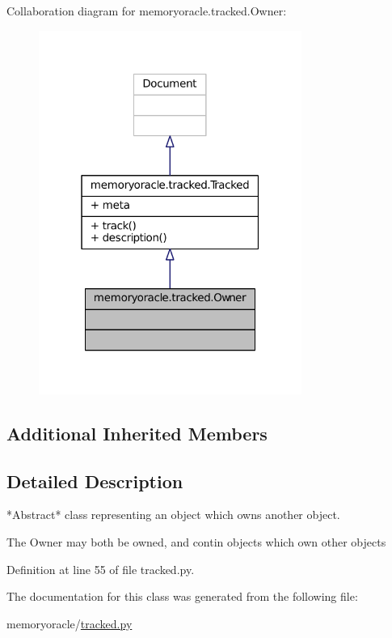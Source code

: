 Collaboration diagram for memoryoracle.\+tracked.\+Owner\+:
\nopagebreak
\begin{figure}[H]
\begin{center}
\leavevmode
\includegraphics[width=244pt]{classmemoryoracle_1_1tracked_1_1Owner__coll__graph}
\end{center}
\end{figure}
\subsection*{Additional Inherited Members}


\subsection{Detailed Description}
\begin{DoxyVerb}*Abstract* class representing an object which owns another object.

The Owner may both be owned, and contin objects which own other objects
\end{DoxyVerb}
 

Definition at line 55 of file tracked.\+py.



The documentation for this class was generated from the following file\+:\begin{DoxyCompactItemize}
\item 
memoryoracle/\hyperlink{tracked_8py}{tracked.\+py}\end{DoxyCompactItemize}
